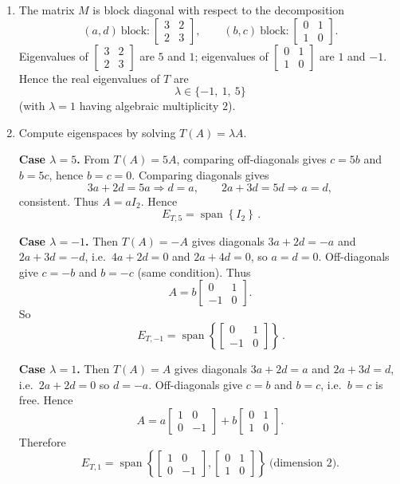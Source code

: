 \documentclass[12pt]{article}
\newcommand{\Span}{\operatorname{span}}
\begin{document}
\begin{enumerate}[label=(\alph*)]
\item The matrix $M$ is block diagonal with respect to the decomposition
\[
(a,d)\ \text{block:}\ \begin{bmatrix}3&2\\2&3\end{bmatrix},
\qquad
(b,c)\ \text{block:}\ \begin{bmatrix}0&1\\1&0\end{bmatrix}.
\]
Eigenvalues of $\begin{bmatrix}3&2\\2&3\end{bmatrix}$ are $5$ and $1$; eigenvalues of $\begin{bmatrix}0&1\\1&0\end{bmatrix}$ are $1$ and $-1$.
Hence the real eigenvalues of $T$ are
\[
\boxed{\,\lambda\in\{-1,\ 1,\ 5\}\,}
\]
(with $\lambda=1$ having algebraic multiplicity $2$).

\item Compute eigenspaces by solving $T(A)=\lambda A$.

\medskip
\noindent\textbf{Case $\lambda=5$.}
From $T(A)=5A$, comparing off-diagonals gives $c=5b$ and $b=5c$, hence $b=c=0$.
Comparing diagonals gives
\[
3a+2d=5a\Rightarrow d=a,\qquad 2a+3d=5d\Rightarrow a=d,
\]
consistent. Thus $A=aI_2$. Hence
\[
\boxed{\,E_{T,5}=\Span\!\left\{I_2\right\}\, }.
\]

\medskip
\noindent\textbf{Case $\lambda=-1$.}
Then $T(A)=-A$ gives diagonals $3a+2d=-a$ and $2a+3d=-d$, i.e.\ $4a+2d=0$ and $2a+4d=0$,
so $a=d=0$. Off-diagonals give $c=-b$ and $b=-c$ (same condition). Thus
\[
A=b\begin{bmatrix}0&1\\-1&0\end{bmatrix}.
\]
So
\[
\boxed{\,E_{T,-1}=\Span\!\left\{\begin{bmatrix}0&1\\-1&0\end{bmatrix}\right\}\, }.
\]

\medskip
\noindent\textbf{Case $\lambda=1$.}
Then $T(A)=A$ gives diagonals $3a+2d=a$ and $2a+3d=d$, i.e.\ $2a+2d=0$ so $d=-a$.
Off-diagonals give $c=b$ and $b=c$, i.e.\ $b=c$ is free.
Hence
\[
A=
a\begin{bmatrix}1&0\\0&-1\end{bmatrix}
+
b\begin{bmatrix}0&1\\1&0\end{bmatrix}.
\]
Therefore
\[
\boxed{\,
E_{T,1}
=
\Span\!\left\{
\begin{bmatrix}1&0\\0&-1\end{bmatrix},
\begin{bmatrix}0&1\\1&0\end{bmatrix}
\right\}
\ \text{(dimension }2\text{)}.
\,}
\]


\end{enumerate}
\end{document}
